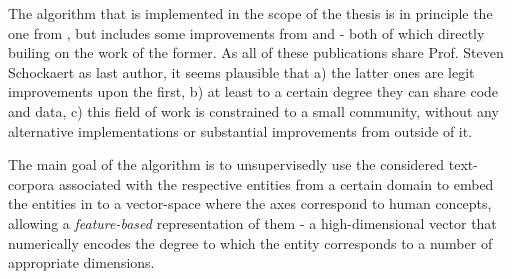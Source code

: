 The algorithm that is implemented in the scope of the thesis is in principle the one from \textcite{Derrac2015}, but includes some improvements from \textcite{Ager2018} and \textcite{Alshaikh2020} - both of which directly builing on the work of the former. As all of these publications share Prof. Steven Schockaert as last author, it seems plausible that a) the latter ones are legit improvements upon the first, b) at least to a certain degree they can share code and data, c) this field of work is constrained to a small community, without any alternative implementations or substantial improvements from outside of it.
\newline

The main goal of the algorithm is to unsupervisedly use the considered text-corpora associated with the respective entities from a certain domain %
to embed the entities in to a vector-space where the axes correspond to human concepts, %
allowing a \textit{feature-based} representation of them - a high-dimensional vector that numerically encodes the degree %
to which the entity corresponds to a number of appropriate dimensions. %
\newline

